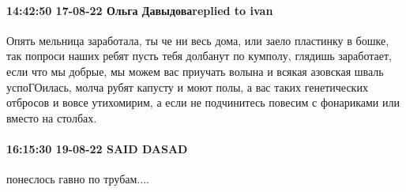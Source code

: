  
 
 
 
 

\paragraph{14:42:50 17-08-22 Ольга Давыдоваreplied to ivan}

Опять мельница заработала, ты че ни весь дома, или заело пластинку в бошке, так
попроси наших ребят пусть тебя долбанут по кумполу, глядишь заработает, если
что мы добрые, мы можем вас приучать волына и всякая азовская шваль
успоГОилась, молча рубят капусту и моют полы, а вас таких генетических отбросов
и вовсе утихомирим, а если не подчинитесь повесим с фонариками или вместо на
столбах.

\paragraph{16:15:30 19-08-22 SAID DASAD}

понеслось гавно по трубам....
